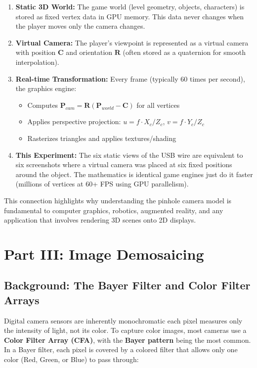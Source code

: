 \documentclass[12pt]{article}
\begin{document}
\begin{enumerate}
    \item \textbf{Static 3D World:} The game world (level geometry, objects, characters) is stored as fixed vertex data in GPU memory. This data never changes when the player moves only the camera changes.
    
    \item \textbf{Virtual Camera:} The player's viewpoint is represented as a virtual camera with position $\mathbf{C}$ and orientation $\mathbf{R}$ (often stored as a quaternion for smooth interpolation).
    
    \item \textbf{Real-time Transformation:} Every frame (typically 60 times per second), the graphics engine:
    \begin{itemize}
        \item Computes $\mathbf{P}_{cam} = \mathbf{R}(\mathbf{P}_{world} - \mathbf{C})$ for all vertices
        \item Applies perspective projection: $u = f \cdot X_c/Z_c$, $v = f \cdot Y_c/Z_c$
        \item Rasterizes triangles and applies textures/shading
    \end{itemize}
    
    \item \textbf{This Experiment:} The six static views of the USB wire are equivalent to six screenshots where a virtual camera was placed at six fixed positions around the object. The mathematics is identical game engines just do it faster (millions of vertices at 60+ FPS using GPU parallelism).
\end{enumerate}

This connection highlights why understanding the pinhole camera model is fundamental to computer graphics, robotics, augmented reality, and any application that involves rendering 3D scenes onto 2D displays.

\newpage
\section*{Part III: Image Demosaicing}

\subsection*{Background: The Bayer Filter and Color Filter Arrays}

Digital camera sensors are inherently monochromatic each pixel measures only the intensity of light, not its color. To capture color images, most cameras use a \textbf{Color Filter Array (CFA)}, with the \textbf{Bayer pattern} being the most common. In a Bayer filter, each pixel is covered by a colored filter that allows only one color (Red, Green, or Blue) to pass through:
\end{document}
